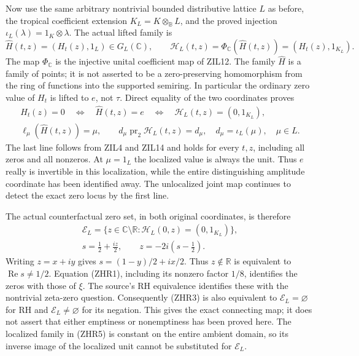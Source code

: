 Now use the same arbitrary nontrivial bounded distributive lattice
$L$ as before, the tropical coefficient extension
$K_L=K\otimes_{\mathbb B}L$, and the proved injection
$\iota_L(\lambda)=1_K\otimes\lambda$. The actual lifted family is
\begin{equation}\tag{ZHR4}
 \widehat H(t,z)=(H_t(z),1_L)\in G_L(\mathbb C),\qquad
 \mathcal H_L(t,z)=\Phi_{\mathbb C}(\widehat H(t,z))
                 =(H_t(z),1_{K_L}).
\end{equation}
The map $\Phi_{\mathbb C}$ is the injective unital coefficient
map of ZIL12. The family $\widehat H$ is a family of points; it
is not asserted to be a zero-preserving homomorphism from the
ring of functions into the supported semiring. In particular
the ordinary zero value of $H_t$ is lifted to $e$, not $\tau$.
Direct equality of the two coordinates proves
\begin{equation}\tag{ZHR5}
\begin{gathered}
 H_t(z)=0
 \quad\Longleftrightarrow\quad \widehat H(t,z)=e
 \quad\Longleftrightarrow\quad
       \mathcal H_L(t,z)=(0,1_{K_L}),\\
 \ell_\mu(\widehat H(t,z))=\mu,\qquad
 d_\mu\operatorname{pr}_2\mathcal H_L(t,z)=d_\mu,
 \quad d_\mu=\iota_L(\mu),\quad\mu\in L.
\end{gathered}
\end{equation}
The last line follows from ZIL4 and ZIL14 and holds for every
$t,z$, including all zeros and all nonzeros. At $\mu=1_L$ the
localized value is always the unit. Thus $e$ really is invertible
in this localization, while the entire distinguishing amplitude
coordinate has been identified away. The unlocalized joint map
continues to detect the exact zero locus by the first line.

The actual counterfactual zero set, in both original coordinates,
is therefore
\begin{equation}\tag{ZHR6}
\begin{gathered}
 \mathcal E_L=\{z\in\mathbb C\setminus\mathbb R:
              \mathcal H_L(0,z)=(0,1_{K_L})\},\\
 s=\frac12+\frac{iz}{2},\qquad
 z=-2i(s-\tfrac12).
\end{gathered}
\end{equation}
Writing $z=x+iy$ gives
$s=(1-y)/2+ix/2$. Thus $z\notin\mathbb R$ is equivalent to
$\operatorname{Re}s\ne1/2$. Equation (ZHR1), including its
nonzero factor $1/8$, identifies the zeros with those of $\xi$.
The source's RH equivalence identifies these with the nontrivial
zeta-zero question. Consequently (ZHR3) is also equivalent to
$\mathcal E_L=\varnothing$ for RH and
$\mathcal E_L\ne\varnothing$ for its negation. This gives the exact
connecting map; it does not assert that either emptiness or
nonemptiness has been proved here. The localized family in (ZHR5)
is constant on the entire ambient domain, so its inverse image of
the localized unit cannot be substituted for $\mathcal E_L$.

